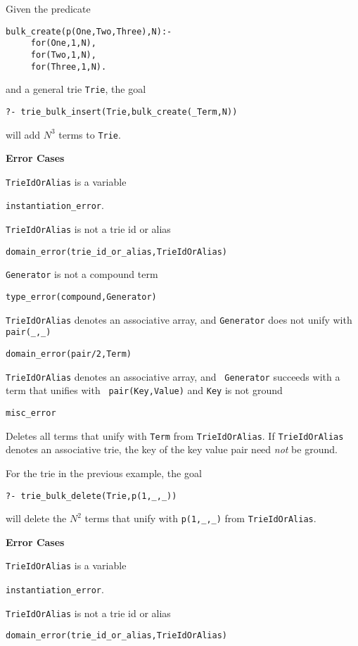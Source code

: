 \begin{description}
\begin{example} \rm
Given the predicate 
\begin{verbatim}
bulk_create(p(One,Two,Three),N):- 
     for(One,1,N),
     for(Two,1,N),
     for(Three,1,N).
\end{verbatim}
and a general trie {\tt Trie}, the goal 
\begin{center}
   {\tt ?- trie\_bulk\_insert(Trie,bulk\_create(\_Term,N))} 
\end{center}
will add $N^3$ terms to {\tt Trie}.
\end{example}

{\bf Error Cases}
\bi
\item 	{\tt TrieIdOrAlias} is a variable
\bi
\item 	{\tt instantiation\_error}.
\ei
\item 	{\tt TrieIdOrAlias} is not a trie id or alias
\bi
\item 	{\tt domain\_error(trie\_id\_or\_alias,TrieIdOrAlias)}
\ei
\item   {\tt Generator} is not a compound term
\bi
\item   {\tt type\_error(compound,Generator)}
\ei
\item 	{\tt TrieIdOrAlias} denotes an associative array, and {\tt Generator} 
  does not unify with {\tt pair(\_,\_)} 
\bi
\item 	{\tt domain\_error(pair/2,Term)}
\ei
\item {\tt TrieIdOrAlias} denotes an associative array, and {\tt
  Generator} succeeds with a term that unifies with {\tt
  pair(Key,Value)} and {\tt Key} is not ground 
\bi
\item 	{\tt misc\_error}
\ei
\ei

% 
Deletes all terms that unify with {\tt Term} from {\tt TrieIdOrAlias}.
If {\tt TrieIdOrAlias} denotes an associative trie, the key of the key
value pair need {\em not} be ground.

\begin{example}\label{ex:bulk-delete} \rm
For the trie in the previous example, the goal 
\begin{center}
{\tt ?-  trie\_bulk\_delete(Trie,p(1,\_,\_))} 
\end{center}
will delete the $N^2$ terms that unify with {\tt p(1,\_,\_)} from {\tt TrieIdOrAlias}.
\end{example}

{\bf Error Cases}
\bi
\item 	{\tt TrieIdOrAlias} is a variable
\bi
\item 	{\tt instantiation\_error}.
\ei
\item 	{\tt TrieIdOrAlias} is not a trie id or alias
\bi
\item 	{\tt domain\_error(trie\_id\_or\_alias,TrieIdOrAlias)}
\ei
\ei


\end{description}
